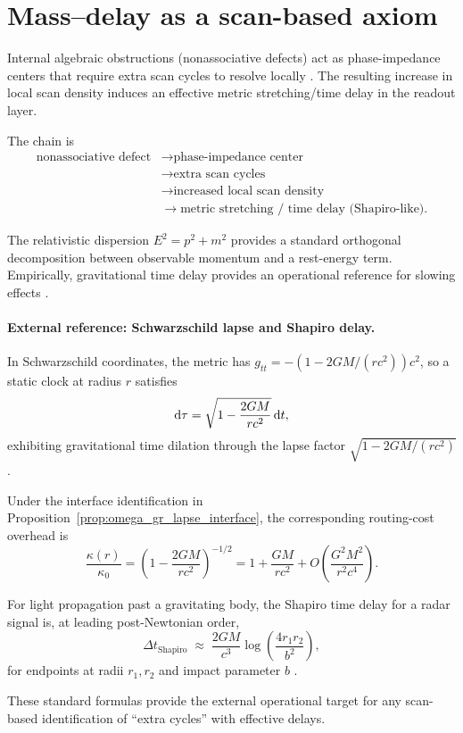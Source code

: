 \section{Mass--delay as a scan-based axiom}
\label{app:mass_delay}

\begin{axiom}
\label{ax:mass_delay_chain}
Internal algebraic obstructions (nonassociative defects) act as phase-impedance centers that require extra scan cycles to resolve locally \cite{Baez2002Octonions,Okubo1995Nonassociative,Schafer1966Nonassociative}. The resulting increase in local scan density induces an effective metric stretching/time delay in the readout layer.
\end{axiom}
\noindent
The chain is
\begin{equation}
\begin{aligned}
\text{nonassociative defect}
&\longrightarrow \text{phase-impedance center}
\\
&\longrightarrow \text{extra scan cycles}
\\
&\longrightarrow \text{increased local scan density}
\\
&\longrightarrow \text{metric stretching / time delay (Shapiro-like)}.
\end{aligned}
\end{equation}

The relativistic dispersion $E^2=p^2+m^2$ provides a standard orthogonal decomposition between observable momentum and a rest-energy term. Empirically, gravitational time delay provides an operational reference for slowing effects \cite{Shapiro1964}.

\paragraph{External reference: Schwarzschild lapse and Shapiro delay.}
In Schwarzschild coordinates, the metric has $g_{tt}=-(1-2GM/(rc^2))c^2$, so a static clock at radius $r$ satisfies
\begin{equation}
\mathrm{d}\tau=\sqrt{1-\frac{2GM}{rc^2}}\,\mathrm{d} t,
\end{equation}
exhibiting gravitational time dilation through the lapse factor $\sqrt{1-2GM/(rc^2)}$ \cite{Wald1984}.

Under the interface identification in Proposition~\ref{prop:omega_gr_lapse_interface}, the corresponding routing-cost overhead is
\begin{equation}
\frac{\kappa(r)}{\kappa_0}=\left(1-\frac{2GM}{rc^2}\right)^{-1/2}
=1+\frac{GM}{rc^2}+O\!\left(\frac{G^2M^2}{r^2c^4}\right).
\end{equation}

For light propagation past a gravitating body, the Shapiro time delay for a radar signal is, at leading post-Newtonian order,
\begin{equation}
\Delta t_{\mathrm{Shapiro}}\;\approx\;\frac{2GM}{c^3}\log\!\left(\frac{4r_1 r_2}{b^2}\right),
\end{equation}
for endpoints at radii $r_1,r_2$ and impact parameter $b$ \cite{Shapiro1964,Will1993}.

These standard formulas provide the external operational target for any scan-based identification of ``extra cycles'' with effective delays.
